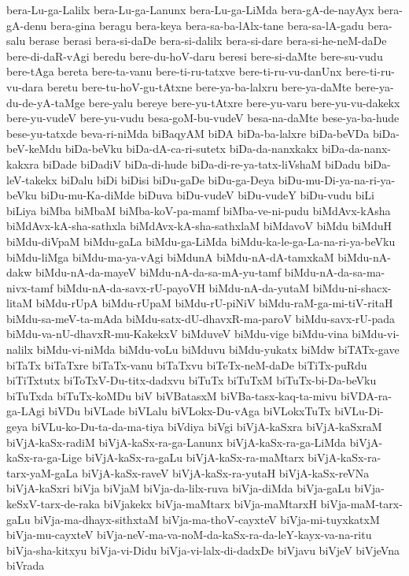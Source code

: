 {bera-Lu-ga-Lalilx
bera-Lu-ga-Lanunx
bera-Lu-ga-LiMda
bera-gA-de-nayAyx
bera-gA-denu
bera-gina
beragu
bera-keya
bera-sa-ba-lAlx-tane
bera-sa-lA-gadu
bera-salu
berase
berasi
bera-si-daDe
bera-si-dalilx
bera-si-dare
bera-si-he-neM-daDe
bere-di-daR-vAgi
beredu
bere-du-hoV-daru
beresi
bere-si-daMte
bere-su-vudu
bere-tAga
bereta
bere-ta-vanu
bere-ti-ru-tatxve
bere-ti-ru-vu-danUnx
bere-ti-ru-vu-dara
beretu
bere-tu-hoV-gu-tAtxne
bere-ya-ba-lalxru
bere-ya-daMte
bere-ya-du-de-yA-taMge
bere-yalu
bereye
bere-yu-tAtxre
bere-yu-varu
bere-yu-vu-dakekx
bere-yu-vudeV
bere-yu-vudu
besa-goM-bu-vudeV
besa-na-daMte
bese-ya-ba-hude
bese-yu-tatxde
beva-ri-niMda
biBaqyAM
biDA
biDa-ba-lalxre
biDa-beVDa
biDa-beV-keMdu
biDa-beVku
biDa-dA-ca-ri-sutetx
biDa-da-nanxkakx
biDa-da-nanx-kakxra
biDade
biDadiV
biDa-di-hude
biDa-di-re-ya-tatx-liVshaM
biDadu
biDa-leV-takekx
biDalu
biDi
biDisi
biDu-gaDe
biDu-ga-Deya
biDu-mu-Di-ya-na-ri-ya-beVku
biDu-mu-Ka-diMde
biDuva
biDu-vudeV
biDu-vudeY
biDu-vudu
biLi
biLiya
biMba
biMbaM
biMba-koV-pa-mamf
biMba-ve-ni-pudu
biMdAvx-kAsha
biMdAvx-kA-sha-sathxla
biMdAvx-kA-sha-sathxlaM
biMdavoV
biMdu
biMduH
biMdu-diVpaM
biMdu-gaLa
biMdu-ga-LiMda
biMdu-ka-le-ga-La-na-ri-ya-beVku
biMdu-liMga
biMdu-ma-ya-vAgi
biMdunA
biMdu-nA-dA-tamxkaM
biMdu-nA-dakw
biMdu-nA-da-mayeV
biMdu-nA-da-sa-mA-yu-tamf
biMdu-nA-da-sa-ma-nivx-tamf
biMdu-nA-da-savx-rU-payoVH
biMdu-nA-da-yutaM
biMdu-ni-shacx-litaM
biMdu-rUpA
biMdu-rUpaM
biMdu-rU-piNiV
biMdu-raM-ga-mi-tiV-ritaH
biMdu-sa-meV-ta-mAda
biMdu-satx-dU-dhavxR-ma-paroV
biMdu-savx-rU-pada
biMdu-va-nU-dhavxR-mu-KakekxV
biMduveV
biMdu-vige
biMdu-vina
biMdu-vi-nalilx
biMdu-vi-niMda
biMdu-voLu
biMduvu
biMdu-yukatx
biMdw
biTATx-gave
biTaTx
biTaTxre
biTaTx-vanu
biTaTxvu
biTeTx-neM-daDe
biTiTx-puRdu
biTiTxtutx
biToTxV-Du-titx-dadxvu
biTuTx
biTuTxM
biTuTx-bi-Da-beVku
biTuTxda
biTuTx-koMDu
biV
biVBatasxM
biVBa-tasx-kaq-ta-mivu
biVDA-ra-ga-LAgi
biVDu
biVLade
biVLalu
biVLokx-Du-vAga
biVLokxTuTx
biVLu-Di-geya
biVLu-ko-Du-ta-da-ma-tiya
biVdiya
biVgi
biVjA-kaSxra
biVjA-kaSxraM
biVjA-kaSx-radiM
biVjA-kaSx-ra-ga-Lanunx
biVjA-kaSx-ra-ga-LiMda
biVjA-kaSx-ra-ga-Lige
biVjA-kaSx-ra-gaLu
biVjA-kaSx-ra-maMtarx
biVjA-kaSx-ra-tarx-yaM-gaLa
biVjA-kaSx-raveV
biVjA-kaSx-ra-yutaH
biVjA-kaSx-reVNa
biVjA-kaSxri
biVja
biVjaM
biVja-da-lilx-ruva
biVja-diMda
biVja-gaLu
biVja-keSxV-tarx-de-raka
biVjakekx
biVja-maMtarx
biVja-maMtarxH
biVja-maM-tarx-gaLu
biVja-ma-dhayx-sithxtaM
biVja-ma-thoV-cayxteV
biVja-mi-tuyxkatxM
biVja-mu-cayxteV
biVja-neV-ma-va-noM-da-kaSx-ra-da-leY-kayx-va-na-ritu
biVja-sha-kitxyu
biVja-vi-Didu
biVja-vi-lalx-di-dadxDe
biVjavu
biVjeV
biVjeVna
biVrada
}
